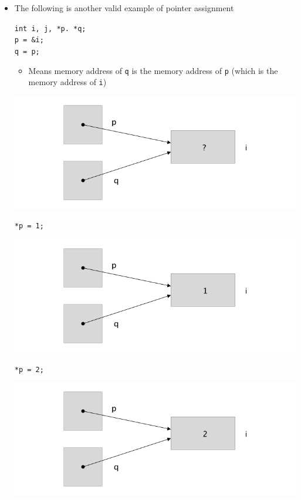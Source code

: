 \documentclass[12pt]{article}
\begin{document}
\begin{enumerate}[1.]
\begin{itemize}
\begin{itemize}
            \bigskip

            \item The following is another valid example of pointer assignment

            \bigskip

            \texttt{int i, j, *p. *q;\\
            p = \&i;\\
            q = p;
            }

            \bigskip

            \begin{itemize}
                \item Means memory address of \texttt{q} is the memory address of \texttt{p} (which is the memory address of \texttt{i})
            \end{itemize}

            \begin{center}
            \includegraphics[width=0.6\linewidth]{images/review_4_solution_1.png}
            \end{center}

            \bigskip

            \texttt{*p = 1;}

            \begin{center}
            \includegraphics[width=0.6\linewidth]{images/review_4_solution_2.png}
            \end{center}

            \bigskip

            \texttt{*p = 2;}

            \begin{center}
            \includegraphics[width=0.6\linewidth]{images/review_4_solution_3.png}
            \end{center}


\end{itemize}
\end{itemize}
\end{enumerate}
\end{document}
